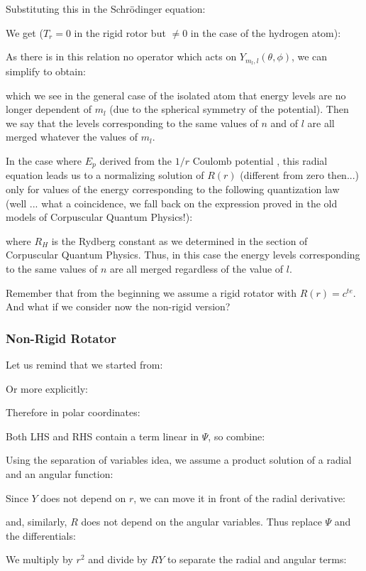 	Substituting this in the Schrödinger equation:
	
	We get ($T_r=0$ in the rigid rotor but $\neq 0$ in the case of the hydrogen atom):
	
	As there is in this relation no operator which acts on $Y_{m_l,l}(\theta,\phi)$, we can simplify to obtain:
	
	which we see in the general case of the isolated atom that energy levels are no longer dependent of $m_l$ (due to the spherical symmetry of the potential). Then we say that the levels corresponding to the same values of $n$ and of $l$ are all merged whatever the values of $m_l$.
	
	In the case where $E_p$ derived from the $1 / r$ Coulomb potential , this radial equation leads us to a normalizing solution of $R (r)$ (different from zero then...) only for values of the energy corresponding to the following quantization law (well ... what a coincidence, we fall back on the expression proved in the old models of Corpuscular Quantum Physics!):
	
	where $R_H$ is the Rydberg constant as we determined in the section of Corpuscular Quantum Physics. Thus, in this case the energy levels corresponding to the same values of $n$ are all merged regardless of the value of $l$.

	Remember that from the beginning we assume a rigid rotator with $R(r)=c^{te}$. And what if we consider now the non-rigid version?
	
	\subsubsection{Non-Rigid Rotator}\label{quantum chemistry non-rigid rotator}
	Let us remind that we started from:
	
	Or more explicitly:
	
	Therefore in polar coordinates:
	
	Both LHS and RHS contain a term linear in $\Psi$, so combine:
	
	Using the separation of variables idea, we assume a product solution of a radial and an angular function:
	
	Since $Y$ does not depend on $r$, we can move it in front of the radial derivative:
	
	and, similarly, $R$ does not depend on the angular variables. Thus replace $\Psi$ and the differentials:
	
	We multiply by $r^2$ and divide by $RY$ to separate the radial and angular terms:
	
